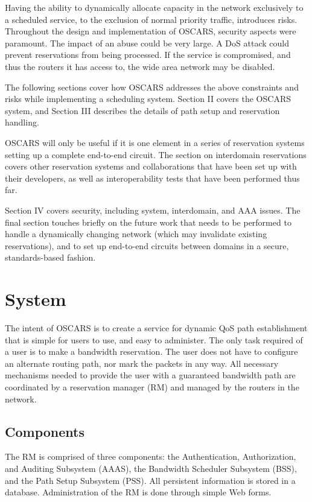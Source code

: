 \documentclass[conference]{IEEEtran}
\begin{document}
Having the ability to dynamically allocate capacity in the network exclusively 
to a scheduled service, to the exclusion of normal priority traffic, introduces 
risks.
Throughout the design and implementation of OSCARS, security aspects were
paramount.  The impact of an abuse could be very
large.  A DoS attack could prevent reservations from being processed.  If the
service is compromised, and thus the routers it has access to, the wide
area network may be disabled.

The following sections cover how OSCARS addresses the above constraints and
risks while implementing a scheduling system.  Section II covers the 
OSCARS system, and Section III describes the details of
path setup and reservation handling.

OSCARS will only be useful if it is one element in a series of reservation
systems setting up a complete end-to-end circuit.
The section on interdomain reservations covers other reservation systems and 
collaborations that have been set up with their developers, as well as 
interoperability tests that have been performed thus far.

Section IV covers security, including system, interdomain, and AAA issues.
The final section touches briefly on the future work that needs to be performed
to handle a dynamically changing network (which may invalidate existing
reservations), and to set up end-to-end circuits between domains
in a secure, standards-based fashion.

\section{System}

The intent of OSCARS is to create a service for dynamic QoS path establishment
that is simple for users to use, and easy to administer.  The only task 
required of a user is to make a bandwidth reservation.  The user does not have 
to configure an alternate routing path, nor mark the packets in any way.  All 
necessary mechanisms needed to provide the user with a guaranteed bandwidth 
path are coordinated by a reservation manager (RM) and managed by the routers 
in the network.

\subsection{Components}

The RM is comprised of three components:  the 
Authentication, Authorization, and Auditing Subsystem (AAAS), the Bandwidth 
Scheduler Subsystem (BSS), and the Path Setup Subsystem (PSS).
All persistent information is stored in a database.  Administration of
the RM is done through simple Web forms.
\end{document}
